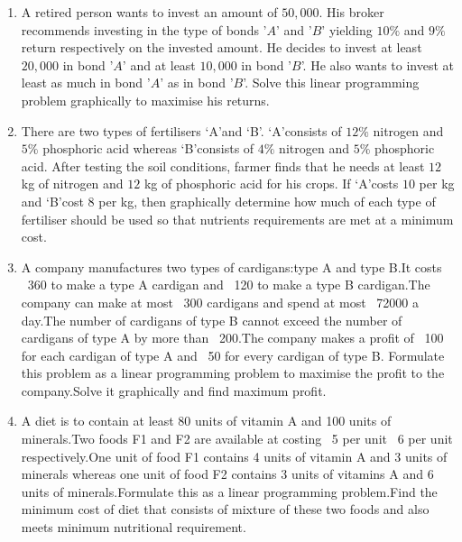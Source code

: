 \begin{enumerate}
	\item A retired person wants to invest an amount of \rupee $50,000$. His broker recommends investing in the type of bonds '$A$' and '$B$' yielding $10\%$ and $9\%$ return respectively on the invested amount. He decides to invest at least \rupee $20,000$ in bond '$A$' and at least \rupee $10,000$ in bond '$B$'. He also wants to invest at least as much in bond '$A$' as in bond '$B$'. Solve this linear programming problem graphically to maximise his returns.
	\item There are two types of fertilisers \lq A\rq and \lq B\rq. \lq A\rq consists of $12\%$ nitrogen and $5\%$ phosphoric acid whereas \lq B\rq consists of $4\%$ nitrogen and $5\%$ phosphoric acid. After testing the soil conditions, farmer finds that he needs at least $12$ kg of nitrogen and $12$ kg of phosphoric acid for his crops. If \lq A\rq costs \rupee $10$ per kg and \lq B\rq cost \rupee $8$ per kg, then graphically determine how much of each type of fertiliser should be used so that nutrients requirements are met at a minimum cost.
	\item A company manufactures two types of cardigans:type A and type B.It costs \rupee~360 to make a type A cardigan and \rupee~120 to make a type B cardigan.The company can make at most \rupee~300 cardigans and spend at most \rupee~72000 a day.The number of cardigans of type B cannot exceed the number of cardigans of type A by more than \rupee~200.The company makes a profit of \rupee~100 for each cardigan of type A and \rupee~50 for every cardigan of type B.
	      Formulate this problem as a linear programming problem to maximise the profit to the company.Solve it graphically and find maximum profit.
	\item A diet is to contain at least 80 units of vitamin A and 100 units of minerals.Two foods F1 and F2 are available at costing \rupee~5 per unit \rupee~6 per unit respectively.One unit of food F1 contains 4 units of vitamin A and 3 units of minerals whereas one unit of food F2 contains  3 units of vitamins A and 6 units of minerals.Formulate this as a linear programming problem.Find the minimum cost of diet that consists of mixture of these two foods and also meets minimum nutritional requirement.

\end{enumerate}
